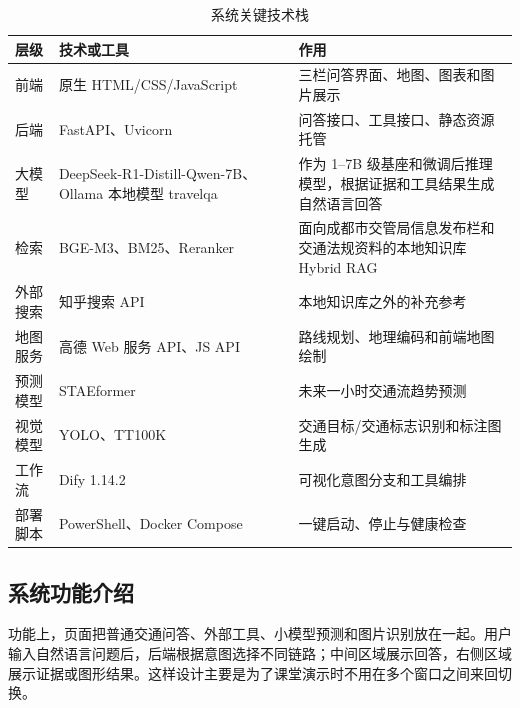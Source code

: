 \documentclass[bwprint]{report}
\begin{document}
\begin{table}[H]
    \caption{系统关键技术栈}
    \label{tab:tech-stack}
    \centering
    \begin{tabular}{p{}p{}p{}}
        \toprule[1.5pt]
        层级 & 技术或工具 & 作用 \\
        \midrule[1pt]
        前端 & 原生 HTML/CSS/JavaScript & 三栏问答界面、地图、图表和图片展示 \\
        后端 & FastAPI、Uvicorn & 问答接口、工具接口、静态资源托管 \\
        大模型 & DeepSeek-R1-Distill-Qwen-7B、Ollama 本地模型 travelqa & 作为 1--7B 级基座和微调后推理模型，根据证据和工具结果生成自然语言回答 \\
        检索 & BGE-M3、BM25、Reranker & 面向成都市交管局信息发布栏和交通法规资料的本地知识库 Hybrid RAG \\
        外部搜索 & 知乎搜索 API & 本地知识库之外的补充参考 \\
        地图服务 & 高德 Web 服务 API、JS API & 路线规划、地理编码和前端地图绘制 \\
        预测模型 & STAEformer & 未来一小时交通流趋势预测 \\
        视觉模型 & YOLO、TT100K & 交通目标/交通标志识别和标注图生成 \\
        工作流 & Dify 1.14.2 & 可视化意图分支和工具编排 \\
        部署脚本 & PowerShell、Docker Compose & 一键启动、停止与健康检查 \\
        \bottomrule[1.5pt]
    \end{tabular}
\end{table}

\subsection{系统功能介绍}
功能上，页面把普通交通问答、外部工具、小模型预测和图片识别放在一起。用户输入自然语言问题后，后端根据意图选择不同链路；中间区域展示回答，右侧区域展示证据或图形结果。这样设计主要是为了课堂演示时不用在多个窗口之间来回切换。
\end{document}
